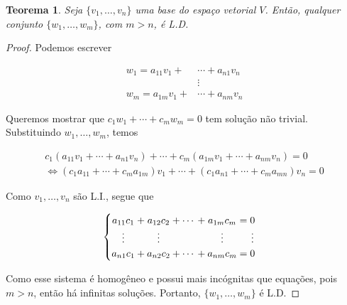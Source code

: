 \documentclass{article}
\newtheorem{theorem}{Teorema}[section]
\begin{document}
\begin{theorem}
	Seja $\{v_1, \dots, v_n\}$ uma base do espaço vetorial $V$. Então, qualquer conjunto $\{w_1, \dots, w_m\}$, com $m>n$, é L.D.
\end{theorem}

\begin{proof}
	Podemos escrever
	
	\begin{align*}
	w_1 = a_{11}v_1 + &\cdots + a_{n1}v_n \\
	&\vdots\\ 
	w_m = a_{1m}v_1 + &\cdots + a_{nm}v_n 
	\end{align*}
	
	\par\vspace{0.3cm} Queremos mostrar que $c_1w_1 + \cdots + c_mw_m = 0$ tem solução não trivial. Substituindo $w_1, \dots, w_m$, temos
	
	\begin{align*}
	c_1(a_{11}v_1 + \cdots + a_{n1}v_n) + \cdots + c_m(a_{1m}v_1 + \cdots + a_{nm}v_n) = 0 \\
	\Leftrightarrow (c_1a_{11} + \cdots + c_ma_{1m})v_1 + \cdots + (c_1a_{n1} + \cdots + c_ma_{mn})v_n = 0
	\end{align*}
	
	\par\vspace{0.3cm} Como $v_1, \dots, v_n$ são L.I., segue que
	
	\begin{align*}
	\begin{cases}
	\begin{array}{*{9}{@{}c@{}}}
	a_{11}c_1 & {}+{} & a_{12}c_2 &{}+{} & \cdots & {}+{} & a_{1m}c_m & {}\mathrel{=}{} & 0 \\
	\vdots    &   & \vdots    &   &        &   & \vdots    &   & \vdots \\
	a_{n1}c_1 & + & a_{n2}c_2 & + & \cdots & + & a_{nm}c_m & = & 0 \\
	\end{array}
	\end{cases}
	\end{align*}
	
	\par\vspace{0.3cm} Como esse sistema é homogêneo e possui mais incógnitas que equações, pois $m>n$, então há infinitas soluções. Portanto, $\{w_1, \dots, w_m\}$ é L.D.
	
\end{proof}
\end{document}
